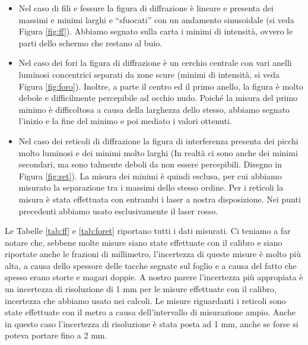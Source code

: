 \begin{itemize}
    \item{Nel caso di fili e fessure la figura di diffrazione è lineare e presenta dei massimi e minimi larghi e ``sfuocati'' con un andamento
        sinusoidale (si veda Figura \ref{fig:ff}). Abbiamo segnato sulla carta i minimi di intensità, ovvero le parti dello schermo
        che restano al buio.}
    \item{Nel caso dei fori la figura di diffrazione è un cerchio centrale con vari anelli luminosi concentrici separati da
        zone scure (minimi di intensità, si veda Figura \ref{fig:foro}). Inoltre, a parte il centro ed il primo anello,
        la figura è molto debole e difficilmente
        percepibile ad occhio nudo. Poiché la misura del primo minimo è difficoltosa a causa della larghezza dello stesso, abbiamo segnato
        l'inizio e la fine del minimo e poi mediato i valori ottenuti.}
    \item{Nel caso dei reticoli di diffrazione la figura di interferenza presenta dei picchi molto luminosi e dei minimi molto larghi
            (In realtà ci sono anche dei minimi secondari, ma sono talmente deboli da non essere percepibili. Disegno in Figura \ref{fig:ret}).
            La misura dei minimi è quindi esclusa, per cui abbiamo misurato la separazione tra i massimi dello stesso ordine.
            Per i reticoli la misura è stata effettuata con entrambi i laser a nostra disposizione. Nei punti precedenti abbiamo
            usato esclusivamente il laser rosso.}
\end{itemize}

Le Tabelle \ref{tab:ff} e \ref{tab:foret} riportano tutti i dati misurati. Ci teniamo a far notare
che, sebbene molte misure siano state effettuate con il calibro e siano riportate anche le frazioni di millimetro,
l'incertezza di queste misure è molto più alta, a causa dello spessore delle tacche segnate sul foglio e a causa del
fatto che spesso erano storte e magari doppie. A nostro parere l'incertezza più appropiata è un incertezza di
risoluzione di 1 mm per le misure effettuate con il calibro, incertezza che abbiamo usato nei calcoli.
Le misure riguardanti i reticoli sono state effettuate con il metro a causa dell'intervallo di misurazione ampio. Anche in questo caso
l'incertezza di risoluzione è stata posta ad 1 mm, anche se forse si poteva portare fino a 2 mm.

